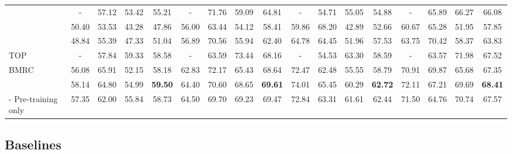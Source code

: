 \documentclass[sigconf]{acmart}
\begin{document}
\begin{table}[ht!]
\begin{table*}[ht!]
{\begin{tabular}{l|cccc|cccc|cccc|cccc}
\hline
 \cite{wu2020grid} & - & 57.12 & 53.42 & 55.21 & - & 71.76 & 59.09 & 64.81 & - & 54.71 & 55.05 & 54.88 & - & 65.89 & 66.27 & 66.08 \\
 \cite{xu2020position} & 50.40 & 53.53 & 43.28 & 47.86 & 56.00 & 63.44 & 54.12 & 58.41 & 59.86 & 68.20 & 42.89 & 52.66 & 60.67 & 65.28 & 51.95 & 57.85 \\
 \cite{xu2020position} & 48.84 & 55.39 & 47.33 & 51.04 & 56.89 & 70.56 & 55.94 & 62.40 & 64.78 & 64.45 & 51.96 & 57.53 & 63.75 & 70.42 & 58.37 & 63.83 \\
TOP \cite{huang2021first} & - & 57.84 & 59.33 & 58.58 & - & 63.59 & 73.44 & 68.16 & - & 54.53 & 63.30 & 58.59 & - & 63.57 & 71.98 & 67.52 \\
BMRC \cite{chen2021bidirectional} & 56.08 & 65.91 & 52.15 & 58.18 & 62.83 & 72.17 & 65.43 & 68.64 & 72.47 & 62.48 & 55.55 & 58.79 & 70.91 & 69.87 & 65.68 & 67.35 \\
\hline
\textbf{\mymodel{}}   & 58.14 & 64.80  & 54.99 &  \textbf{59.50}   &  64.40  & 70.60   & 68.65 &  \textbf{69.61}  & 74.01 & 65.45 & 60.29 &  \textbf{62.72}  & 72.11 & 67.21 & 69.69 &  \textbf{68.41} \\
 \hspace{6mm} - Pre-training only        & 57.35  & 62.00 & 55.84 &  58.73 &  64.50 & 69.70 & 69.23 & 69.47 & 72.84 & 63.31 & 61.61 & 62.44 & 71.50 & 64.76 & 70.74 & 67.57  \\
\bottomrule
\end{tabular}
}
\end{table*}



\subsection{Baselines}




\end{table}
\end{document}
